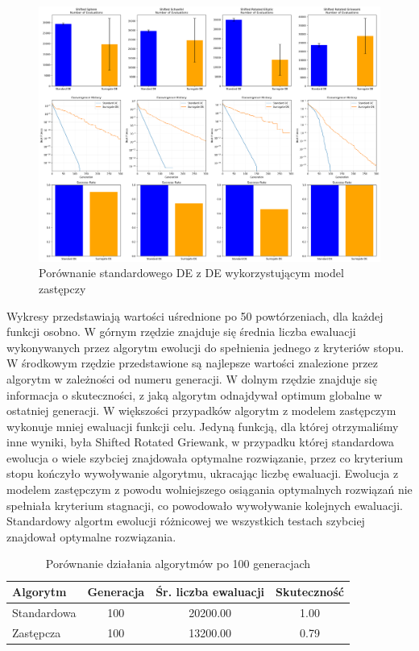 \documentclass{article}
\begin{document}
\begin{figure}[H]
    \centering
    \includegraphics[width=\textwidth]{comprehensive_results.png}
    \caption{Porównanie standardowego DE z DE wykorzystującym model zastępczy}
    \label{fig:comprehensive_results}
\end{figure}

Wykresy przedstawiają wartości uśrednione po 50 powtórzeniach, dla każdej funkcji osobno. W górnym rzędzie znajduje się średnia liczba ewaluacji wykonywanych przez algorytm ewolucji do spełnienia jednego z kryteriów stopu. W środkowym rzędzie przedstawione są najlepsze wartości znalezione przez algorytm w zależności od numeru generacji. W dolnym rzędzie znajduje się informacja o skuteczności, z jaką algorytm odnajdywał optimum globalne w ostatniej generacji. 
W większości przypadków algorytm z modelem zastępczym wykonuje mniej ewaluacji funkcji celu. Jedyną funkcją, dla której otrzymaliśmy inne wyniki, była Shifted Rotated Griewank, w przypadku której standardowa ewolucja o wiele szybciej znajdowała optymalne rozwiązanie, przez co kryterium stopu kończyło wywoływanie algorytmu, ukracając liczbę ewaluacji. Ewolucja z modelem zastępczym z powodu wolniejszego osiągania optymalnych rozwiązań nie spełniała kryterium stagnacji, co powodowało wywoływanie kolejnych ewaluacji. 
Standardowy algortm ewolucji różnicowej we wszystkich testach szybciej znajdował optymalne rozwiązania.

\begin{table}[h]
    \centering
    \begin{tabular}{|l|c|c|c|}
        \hline
        Algorytm & Generacja & Śr. liczba ewaluacji & Skuteczność \\
        \hline
        Standardowa & 100 & 20200.00 & 1.00 \\
        Zastępcza & 100 & 13200.00 & 0.79 \\
        \hline
    \end{tabular}
    \caption{Porównanie działania algorytmów po 100 generacjach}
    \label{tab:de_comparison}
\end{table}
\end{document}
